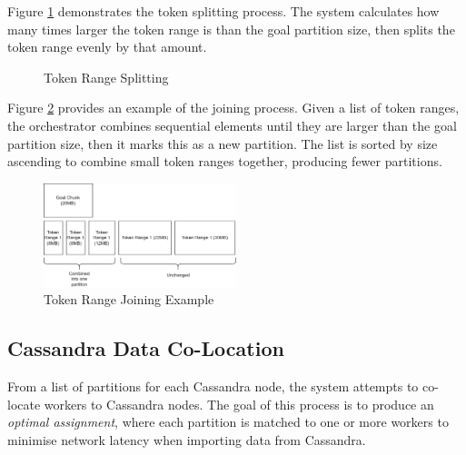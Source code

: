 Figure \ref{fig:cassandra-split-process} demonstrates the token splitting process. The system calculates how many times larger the token range is than the goal partition size, then splits the token range evenly by that amount.

\begin{figure}[h]
	\centering
	\qquad
	\caption{Token Range Splitting}
	\label{fig:cassandra-split-process}
\end{figure}

Figure \ref{fig:cassandra-join-process} provides an example of the joining process. Given a list of token ranges, the orchestrator combines sequential elements until they are larger than the goal partition size, then it marks this as a new partition. The list is sorted by size ascending to combine small token ranges together, producing fewer partitions.

\begin{figure}[h]
	\centering
	\includegraphics[width=0.5\textwidth]{chapters/diagrams/implementation/cassandra-join-example}
	\caption{Token Range Joining Example}
	\label{fig:cassandra-join-process}
\end{figure}


\pagebreak
\subsection{Cassandra Data Co-Location}\label{subsec:colocation}
From a list of partitions for each Cassandra node, the system attempts to co-locate workers to Cassandra nodes. The goal of this process is to produce an \textit{optimal assignment}, where each partition is matched to one or more workers to minimise network latency when importing data from Cassandra.

